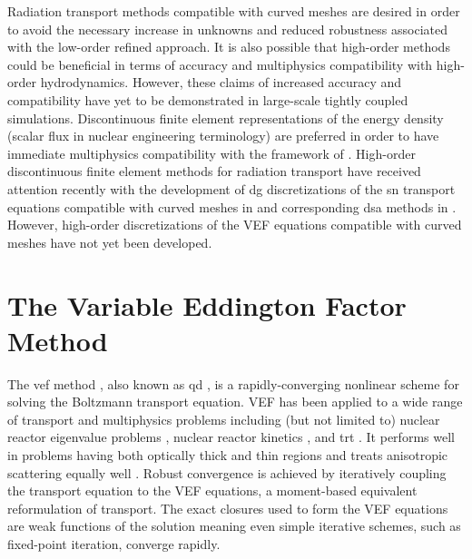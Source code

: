 \documentclass[../doc.tex]{subfiles}
\begin{document}
Radiation transport methods compatible with curved meshes are desired in order to avoid the necessary increase in unknowns and reduced robustness associated with the low-order refined approach. It is also possible that high-order methods could be beneficial in terms of accuracy and multiphysics compatibility with high-order hydrodynamics. However, these claims of increased accuracy and compatibility have yet to be demonstrated in large-scale tightly coupled simulations. Discontinuous finite element representations of the energy density (scalar flux in nuclear engineering terminology) are preferred in order to have immediate multiphysics compatibility with the framework of \cite{blast}. High-order discontinuous finite element methods for radiation transport have received attention recently with the development of \gls{dg} discretizations of the \gls{sn} transport equations compatible with curved meshes in \cite{graph_sweeps,woods_thesis} and corresponding \gls{dsa} methods in \cite{ldrd_dsa,doi:10.1080/00295639.2020.1799603}. However, high-order discretizations of the VEF equations compatible with curved meshes have not yet been developed. 

\section{The Variable Eddington Factor Method}
The \gls{vef} method \cite{mihalas}, also known as \gls{qd} \cite{goldin}, is a rapidly-converging nonlinear scheme for solving the Boltzmann transport equation. VEF has been applied to a wide range of transport and multiphysics problems including (but not limited to) nuclear reactor eigenvalue problems \cite{airstova_eigenvalue}, nuclear reactor kinetics \cite{doi:10.13182/NSE13-42}, and \gls{trt} \cite{anistratov1996nonlinear}. It performs well in problems having both optically thick and thin regions and treats anisotropic scattering equally well \cite{anistratov_fvm,ARISTOVA2000139}. Robust convergence is achieved by iteratively coupling the transport equation to the VEF equations, a moment-based equivalent reformulation of transport. The exact closures used to form the VEF equations are weak functions of the solution meaning even simple iterative schemes, such as fixed-point iteration, converge rapidly. 
\end{document}
